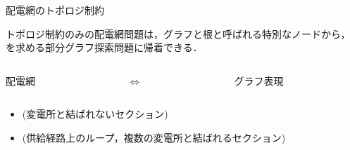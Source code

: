 \documentclass[dvipdfmx,11pt]{beamer}
\begin{document}
\begin{frame}{配電網のトポロジ制約}
  \renewcommand{\thefootnote}{\fnsymbol{footnote}}
  \setcounter{footnote}{1}
  \begin{block}{}
   トポロジ制約のみの配電網問題は，グラフと根と呼ばれる特別なノードから，
   を求める部分グラフ探索問題に帰着できる．
  \end{block}
  \begin{columns}
    \begin{column}{0.45\textwidth}\centering
      \begin{exampleblock}{配電網}
    \centering
    \scalebox{0.35}{}
      \end{exampleblock}
    \end{column}
    \begin{column}{0.05\textwidth}\centering
      $\Leftrightarrow$
    \end{column}
    \begin{column}{0.45\textwidth}\centering
      \begin{exampleblock}{グラフ表現}
        \centering
       \scalebox{0.5}{}
      \end{exampleblock}
    \end{column}
  \end{columns}
 \vfill
  \begin{itemize}
   \item {}(変電所と結ばれないセクション)
   \item {}(供給経路上のループ，複数の変電所と結ばれるセクション)
 \end{itemize}
\end{frame}
\end{document}
